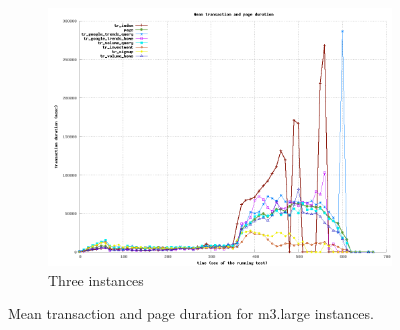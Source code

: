 \documentclass[dvips,12pt]{article}
\begin{document}
\begin{figure}[h!]
\begin{subfigure}[b]{0.3\textwidth}
        \includegraphics[width=\textwidth]{images/horizontal_m3large_dbm3large/transaction_4.png}
        \caption{Three instances}
    \end{subfigure}
    \caption{Mean transaction and page duration for m3.large instances.}
\end{figure}
\end{document}
